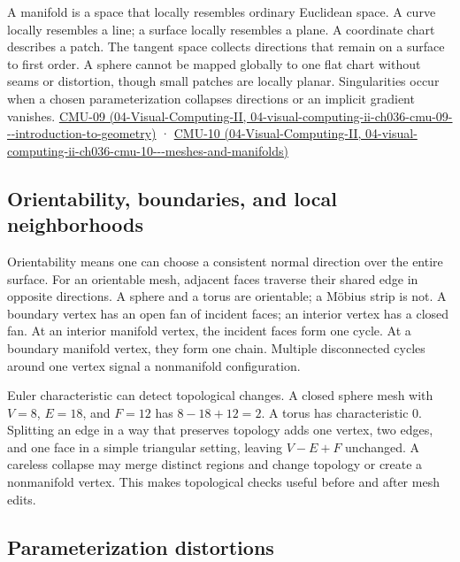 A manifold is a space that locally resembles ordinary Euclidean space. A curve locally resembles a line; a surface locally resembles a plane. A coordinate chart describes a patch. The tangent space collects directions that remain on a surface to first order. A sphere cannot be mapped globally to one flat chart without seams or distortion, though small patches are locally planar. Singularities occur when a chosen parameterization collapses directions or an implicit gradient vanishes. \href{../04-Visual-Computing-II/main.pdf\#nameddest=04-visual-computing-ii-ch036-cmu-09---introduction-to-geometry}{CMU-09 (04-Visual-Computing-II, 04-visual-computing-ii-ch036-cmu-09-\/-\/-introduction-to-geometry)} · \href{../04-Visual-Computing-II/main.pdf\#nameddest=04-visual-computing-ii-ch036-cmu-10---meshes-and-manifolds}{CMU-10 (04-Visual-Computing-II, 04-visual-computing-ii-ch036-cmu-10-\/-\/-meshes-and-manifolds)}

\subsection{Orientability, boundaries, and local neighborhoods}\label{03-visual-computing-i-ch002-orientability-boundaries-and-local-neighborhoods}

Orientability means one can choose a consistent normal direction over the entire surface. For an orientable mesh, adjacent faces traverse their shared edge in opposite directions. A sphere and a torus are orientable; a Möbius strip is not. A boundary vertex has an open fan of incident faces; an interior vertex has a closed fan. At an interior manifold vertex, the incident faces form one cycle. At a boundary manifold vertex, they form one chain. Multiple disconnected cycles around one vertex signal a nonmanifold configuration.

Euler characteristic can detect topological changes. A closed sphere mesh with \(V=8\), \(E=18\), and \(F=12\) has \(8-18+12=2\). A torus has characteristic 0. Splitting an edge in a way that preserves topology adds one vertex, two edges, and one face in a simple triangular setting, leaving \(V-E+F\) unchanged. A careless collapse may merge distinct regions and change topology or create a nonmanifold vertex. This makes topological checks useful before and after mesh edits.

\subsection{Parameterization distortions}\label{03-visual-computing-i-ch002-parameterization-distortions}

